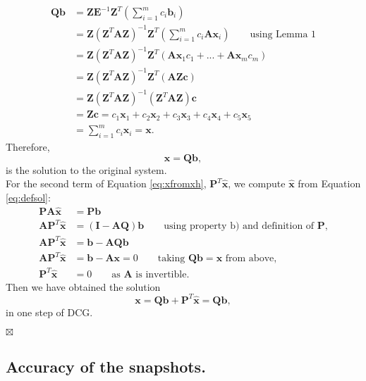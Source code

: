 \documentclass[12pt]{article}
\numberwithin{equation}{section}
\begin{document}
\begin{align*}
\mathbf{Q}\mathbf{b}&=\mathbf{Z}\mathbf{E}^{-1}\mathbf{Z}^T\left(\sum_{i=1}^m {c}_i\mathbf{b}_i\right)\\
&=\mathbf{Z}(\mathbf{Z}^T\mathbf{A}\mathbf{Z})^{-1}\mathbf{Z}^T\left(\sum_{i=1}^m {c}_i\mathbf{A}\mathbf{x}_i\right)\qquad \text{using Lemma 1}\\
&=\mathbf{Z}(\mathbf{Z}^T\mathbf{A}\mathbf{Z})^{-1}\mathbf{Z}^T\left( \mathbf{A}\mathbf{x}_1{c}_1+...+\mathbf{A}\mathbf{x}_m{c}_m\right) \\
&=\mathbf{Z}(\mathbf{Z}^T\mathbf{A}\mathbf{Z})^{-1}\mathbf{Z}^T(\mathbf{A}\mathbf{Z}\mathbf{c})  \\
&=\mathbf{Z}(\mathbf{Z}^T\mathbf{A}\mathbf{Z})^{-1}(\mathbf{Z}^T\mathbf{A}\mathbf{Z})\mathbf{c} \\
&=\mathbf{Z}\mathbf{c}= c_1\mathbf{x}_1+c_2\mathbf{x}_2+c_3\mathbf{x}_3+c_4\mathbf{x}_4+c_5\mathbf{x}_5\\
& =\sum_{i=1}^m {c}_i\mathbf{x}_i=\mathbf{x}.
\end{align*}
Therefore,
\begin{equation}\label{eq:xqb}
\mathbf{x}=\mathbf{Q}\mathbf{b},
\end{equation}
is the solution to the original system.\\ 
For the second term of Equation \eqref{eq:xfromxh}, $\mathbf{P}^T\mathbf{\hat{x}}$, we compute $\mathbf{\hat{x}}$ from Equation \eqref{eq:defsol}:
\begin{align*}
    \mathbf{P}\mathbf{A}\hat{\mathbf{x}}&=\mathbf{P}\mathbf{b}\\
    \mathbf{A}\mathbf{P}^T\hat{\mathbf{x}}&=(\mathbf{I}-\mathbf{A}\mathbf{Q})\mathbf{b} \qquad \text{using property b) and definition of $\mathbf{P}$,}\\
        \mathbf{A}\mathbf{P}^T\hat{\mathbf{x}}&=\mathbf{b}-\mathbf{A}\mathbf{Q}\mathbf{b}\\
        \mathbf{A}\mathbf{P}^T\hat{\mathbf{x}}&=\mathbf{b}-\mathbf{A}\mathbf{x}=0 \qquad \text{taking $\mathbf{Q}\mathbf{b}=\mathbf{x}$ from above,}\\
          \mathbf{P}^T\hat{\mathbf{x}}&=0 \qquad \text{as $\mathbf{A}$ is invertible.}
\end{align*}
Then we have obtained the solution 
$$\mathbf{x}=\mathbf{Q}\mathbf{b}+\mathbf{P}^T\mathbf{\hat{x}}=\mathbf{Q}\mathbf{b},$$ 
in one step of DCG.
\begin{flushright}
$\boxtimes $                
\end{flushright}
\subsection{Accuracy of the snapshots.}\label{accs}
\end{document}
